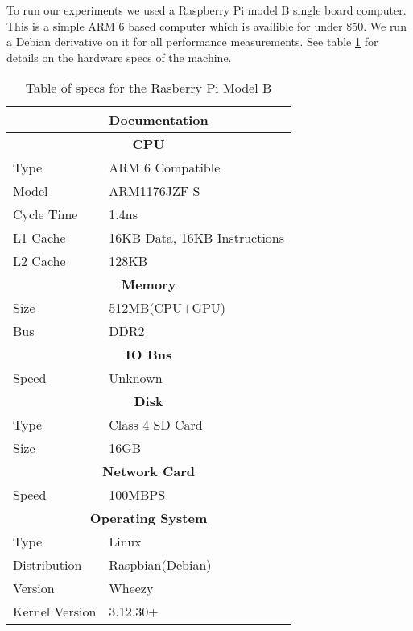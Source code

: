To run our experiments we used a Raspberry Pi model B single board computer.   
This is a simple ARM 6 based computer which is availible for under \$50.
We run a Debian derivative on it for all performance measurements.
See table \ref{tbl:specs} for details on the hardware specs of the machine.

\begin{table}[h]
\label{tbl:specs}
\centering
\begin{tabular}{|l|l|}
\hline
                     & Documentation            \\ \hline
\multicolumn{2}{|c|}{\textbf{CPU}}              \\ \hline
Type                 & ARM 6 Compatible         \\ \hline
Model                & ARM1176JZF-S             \\ \hline
Cycle Time           & 1.4ns                    \\ \hline
L1 Cache             & 16KB Data, 16KB Instructions          \\ \hline
L2 Cache             & 128KB           \\ \hline
\multicolumn{2}{|c|}{\textbf{Memory}}           \\ \hline
Size                 & 512MB(CPU+GPU)           \\ \hline
Bus                  & DDR2                     \\ \hline
\multicolumn{2}{|c|}{\textbf{IO Bus}}           \\ \hline
Speed                & Unknown                  \\ \hline
\multicolumn{2}{|c|}{\textbf{Disk}}             \\ \hline
Type                 & Class 4 SD Card          \\ \hline
Size                 & 16GB                     \\ \hline
\multicolumn{2}{|c|}{\textbf{Network Card}}     \\ \hline
Speed                & 100MBPS                  \\ \hline
\multicolumn{2}{|c|}{\textbf{Operating System}} \\ \hline
Type                 & Linux                    \\ \hline
Distribution       & Raspbian(Debian)\\ \hline
Version             & Wheezy\\ \hline
Kernel Version  & 3.12.30+ \\\hline
\end{tabular}
\caption{Table of specs for the Rasberry Pi Model B\cite{infosheet}\cite{rpicomp}\cite{elinux}}
\end{table}